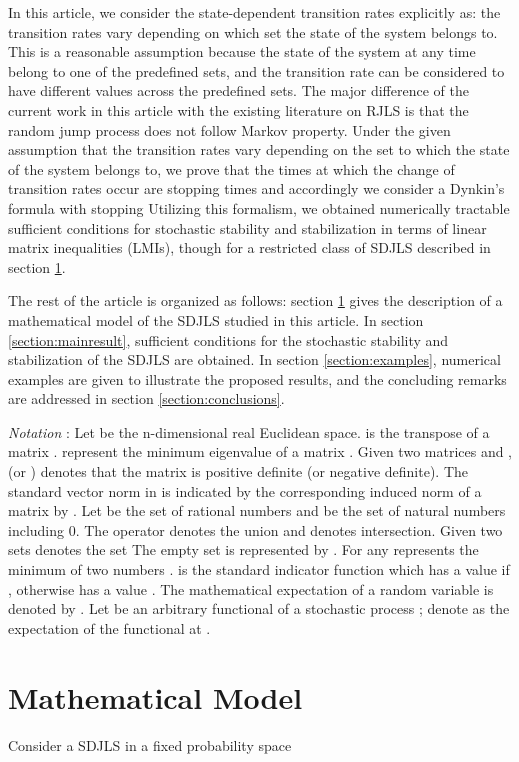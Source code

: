 \documentclass[10.5pt,a4paper]{article}
\theoremstyle{remark}
\theoremstyle{plain}
\theoremstyle{plain}
\theoremstyle{remark}
\theoremstyle{plain}
\theoremstyle{plain}
\begin{document}
In this article, we consider the state-dependent transition rates
explicitly as: the transition rates vary depending on which set the
state of the system belongs to. This is a reasonable assumption because
the state of the system at any time belong to one of the predefined
sets, and the transition rate can be considered to have different
values across the predefined sets. The major difference of the current
work in this article with the existing literature on RJLS is that
the random jump process does not follow Markov property. Under the
given assumption that the transition rates vary depending on the set
to which the state of the system belongs to, we prove that the times
at which the change of transition rates occur are stopping times and
accordingly we consider a Dynkin's formula with stopping
Utilizing this formalism, we obtained numerically tractable
sufficient conditions for stochastic stability and stabilization in
terms of linear matrix inequalities (LMIs), though for a restricted
class of SDJLS described in section \ref{section:mathematical}.

The rest of the article is organized as follows: section \ref{section:mathematical}
gives the description of a mathematical model of the SDJLS studied
in this article. In section \ref{section:mainresult}, sufficient
conditions for the stochastic stability and stabilization of the SDJLS
are obtained. In section \ref{section:examples}, numerical examples
are given to illustrate the proposed results, and the concluding remarks
are addressed in section \ref{section:conclusions}.

\textit{Notation} : Let  be the n-dimensional real
Euclidean space.  is the transpose of a matrix . 
represent the minimum eigenvalue of a matrix . Given two matrices
 and ,  (or ) denotes that the matrix
 is positive definite (or negative definite). The standard vector
norm in  is indicated by  the corresponding
induced norm of a matrix  by . Let 
be the set of rational numbers and  be the set of
natural numbers including 0. The operator  denotes the union
and  denotes intersection. Given two sets  
denotes the set  The empty set is represented by .
For any   represents the minimum of
two numbers . is the standard indicator function
which has a value  if , otherwise has a value . The
mathematical expectation of a random variable  is denoted by .
Let  be an arbitrary functional of a stochastic process
; denote  as the expectation
of the functional  at .



\section{Mathematical Model}\label{section:mathematical}
Consider a SDJLS in a fixed probability space 
\end{document}
